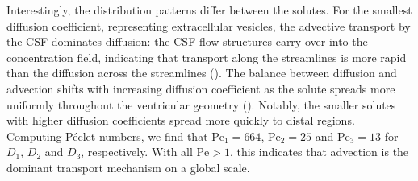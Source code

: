 \documentclass{WileyMSP-template}
\begin{document}
Interestingly, the distribution patterns differ between the
solutes. For the smallest diffusion coefficient, representing
extracellular vesicles, the advective transport by the CSF dominates diffusion: the
CSF flow structures carry over into the concentration field,
indicating that transport along the streamlines is more rapid than the
diffusion across the streamlines (). The
balance between diffusion and advection shifts with increasing
diffusion coefficient as the solute spreads more uniformly throughout
the ventricular geometry (). Notably, the
smaller solutes with higher diffusion coefficients spread more quickly
to distal regions. Computing Péclet numbers, we find that
$\mathrm{Pe}_1=664$, $\mathrm{Pe}_2=25$ and $\mathrm{Pe}_3=13$ for
$D_1$, $D_2$ and $D_3$, respectively. With all $\mathrm{Pe} > 1$, this
indicates that advection is the dominant transport mechanism on a
global scale.
\end{document}
